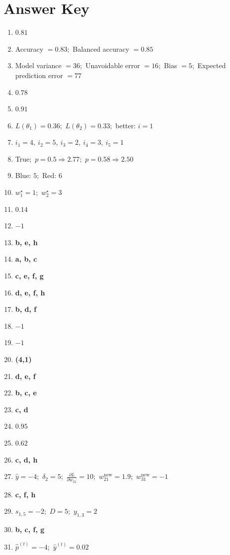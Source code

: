\documentclass[11pt,oneside]{article}
\begin{document}
\newpage
\section*{Answer Key}

\begin{enumerate}[label=\textbf{Q\arabic*.}, leftmargin=3em, itemsep=4pt]
  \item $0.81$
  \item Accuracy $= 0.83$;\ Balanced accuracy $= 0.85$
  \item Model variance $= 36$;\ Unavoidable error $= 16$;\ Bias $= 5$;\ Expected prediction error $= 77$
  \item $0.78$
  \item $0.91$
  \item $L(\theta_1) = 0.36$;\ $L(\theta_2) = 0.33$;\ better: $i=1$
  \item $i_1=4,\ i_2=5,\ i_3=2,\ i_4=3,\ i_5=1$
  \item True;\ $p=0.5 \Rightarrow 2.77$;\ $p=0.58 \Rightarrow 2.50$
  \item Blue: $5$;\ Red: $6$
  \item $w_1^\star=1$;\ $w_2^\star=3$
  \item $0.14$
  \item $-1$
  \item \textbf{b, e, h}
  \item \textbf{a, b, c}
  \item \textbf{c, e, f, g}
  \item \textbf{d, e, f, h}
  \item \textbf{b, d, f}
  \item $-1$
  \item $-1$
  \item \textbf{(4,1)}
  \item \textbf{d, e, f}
  \item \textbf{b, c, e}
  \item \textbf{c, d}
  \item $0.95$
  \item $0.62$
  \item \textbf{c, d, h}
  \item $\hat{y}=-4$;\ $\delta_2=5$;\ $\frac{\partial L}{\partial w_{21}}=10$;\ $w_{21}^{\mathrm{new}}=1.9$;\ $w_{31}^{\mathrm{new}}=-1$
  \item \textbf{c, f, h}
  \item $s_{1,5}=-2$;\ $D=5$;\ $y_{1,3}=2$
  \item \textbf{b, c, f, g}
  \item $\hat{p}^{(t)}=-4$;\ $\hat{y}^{(t)}=0.02$
\end{enumerate}
\end{document}
